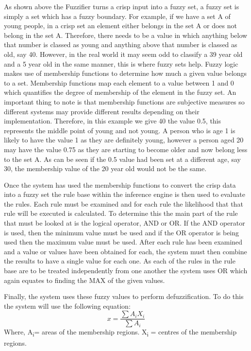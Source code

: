 \documentclass{article}
\begin{document}
As shown above the Fuzzifier turns a crisp input into a fuzzy set, a fuzzy set is simply a set which has a fuzzy boundary. For example, if we have a set A of young people, in a crisp set an element either belongs in the set A or does not belong in the set A. Therefore, there needs to be a value in which anything below that number is classed as young and anything above that number is classed as old, say 40. However, in the real world it may seem odd to classify a 39 year old and a 5 year old in the same manner, this is where fuzzy sets help. Fuzzy logic makes use of membership functions to determine how much a given value belongs to a set. Membership functions map each element to a value between 1 and 0 which quantifies the degree of membership of the element in the fuzzy set. An important thing to note is that membership functions are subjective measures so different systems may provide different results depending on their implementation. Therefore, in this example we give 40 the value 0.5, this represents the middle point of young and not young. A person who is age 1 is likely to have the value 1 as they are definitely young, however a person aged 20 may have the value 0.75 as they are starting to become older and now belong less to the set A. As can be seen if the 0.5 value had been set at a different age, say 30, the membership value of the 20 year old would not be the same.

Once the system has used the membership functions to convert the crisp data into a fuzzy set the rule base within the inference engine is then used to evaluate the rules. Each rule must be examined and for each rule the likelihood that that rule will be executed is calculated. To determine this the main part of the rule that must be looked at is the logical operator, AND or OR. If the AND operator is used, then the minimum value must be used and if the OR operator is being used then the maximum value must be used. After each rule has been examined and a value or values have been obtained for each, the system must then combine the results to have a single value for each one. As each of the rules in the rule base are to be treated independently from one another the system uses OR which again equates to finding the MAX of the given values.

Finally, the system uses these fuzzy values to perform defuzzification. To do this the system will use the following equation:
\[ 
	x = \frac {\sum A_i X_i}{\sum A_i}
\]
Where,
A\textsubscript{i}= areas of the membership regions.
X\textsubscript{i} = centres of the membership regions.
\end{document}
